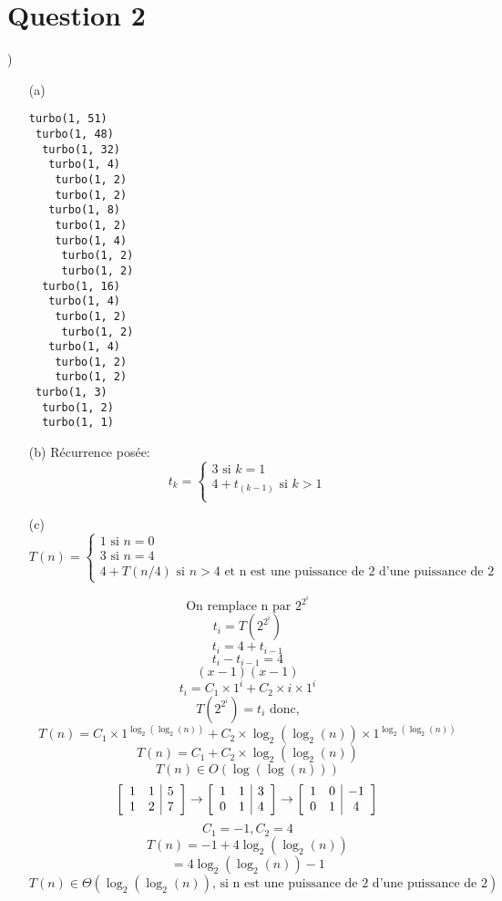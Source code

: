 \documentclass[10pt,letterpaper]{article}
\newenvironment{mymatrix}
{\left[ \begin{array}{cc|c}}
	{\end{array} \right]}
\begin{document}
	\section*{Question 2}
	\setcounter{equation}{0})
	\begin{enumerate}
		\item[(a)]
		\begin{verbatim}
turbo(1, 51)
 turbo(1, 48)
  turbo(1, 32)
   turbo(1, 4)
    turbo(1, 2)
    turbo(1, 2)
   turbo(1, 8)
    turbo(1, 2)
    turbo(1, 4)
     turbo(1, 2)
     turbo(1, 2)
  turbo(1, 16)
   turbo(1, 4)
    turbo(1, 2)
     turbo(1, 2)
   turbo(1, 4)
   	turbo(1, 2)
	turbo(1, 2)
 turbo(1, 3)
  turbo(1, 2)
  turbo(1, 1)
		\end{verbatim}
		\item[(b)]
		Récurrence posée:
		\begin{equation*}
		t_k =
		\begin{cases}
		3 \text{ si } k=1\\
		4 + t_{(k-1)} \text{ si } k > 1\\
		\end{cases}
		\end{equation*}
		\item[(c)]
		\setcounter{equation}{0}
		\begin{equation*}
		T(n) =
		\begin{cases}
		1 \text{ si } n=0\\
		3 \text{ si } n=4\\
		4 + T(n/4) \text{ si } n>4 \text{ et n est une puissance de 2 d'une puissance de 2}
		\end{cases}
		\end{equation*}
		

		$$\text{On remplace n par } 2^{2^i}$$
		$$t_i = T(2^{2^i})$$
		$$t_i = 4 + t_{i-1}$$
		$$t_i - t_{i-1} = 4$$
		$$(x-1)(x-1)$$
		$$t_i = C_1\times 1^i + C_2\times i \times 1^i$$
		$$T(2^{2^i}) = t_i \text{ donc,}$$
		$$T(n) = C_1\times 1^{\log_2(\log_2(n))} + C_2\times \log_2(\log_2(n)) \times 1^{\log_2(\log_2(n))}$$
		$$T(n) = C_1 + C_2 \times \log_2(\log_2(n))$$
		$$T(n) \in O(\log(\log(n)))$$
		$$
		\begin{mymatrix}
			1&1&5\\
			1&2&7\\
		\end{mymatrix}
		\rightarrow
		\begin{mymatrix}
		1&1&3\\
		0&1&4\\
		\end{mymatrix}
		\rightarrow
		\begin{mymatrix}
		1&0&-1\\
		0&1&4\\
		\end{mymatrix}
		$$
		$$C_1 = -1, C_2 = 4$$
		$$T(n) = -1 + 4 \log_2(\log_2(n))$$
		$$= 4 \log_2(\log_2(n)) - 1$$
		$$T(n) \in \Theta(\log_2(\log_2(n)) \text{, si n est une puissance de 2 d'une puissance de 2})$$
	\end{enumerate}
	
\end{document}
